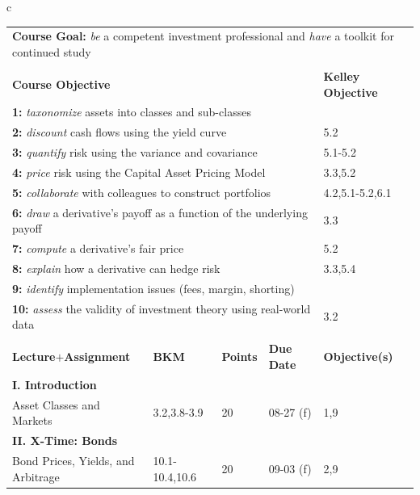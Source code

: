 \documentclass[12pt]{article} %
\begin{document}
\begin{table}[H]
	\small
	\begin{center}
		\begin{tabular}{c}
		\begin{tabular}{lllll}
			\multicolumn{5}{l}{\textbf{Course Goal:} \textit{be} a competent investment professional and \textit{have} a toolkit for continued study}\\ \\
			\multicolumn{4}{l}{\textbf{Course Objective}} & \textbf{Kelley Objective}\\ \hline
			\multicolumn{4}{l}{\textbf{ 1:} \textit{taxonomize} assets into classes and sub-classes} & \\
			\multicolumn{4}{l}{\textbf{ 2:} \textit{discount} cash flows using the yield curve} & 5.2\\
			\multicolumn{4}{l}{\textbf{ 3:} \textit{quantify} risk using the variance and covariance} & 5.1-5.2\\
			\multicolumn{4}{l}{\textbf{ 4:} \textit{price} risk using the Capital Asset Pricing Model} &3.3,5.2 \\
			\multicolumn{4}{l}{\textbf{ 5:} \textit{collaborate} with colleagues to construct portfolios} & 4.2,5.1-5.2,6.1\\
			\multicolumn{4}{l}{\textbf{ 6:} \textit{draw} a derivative's payoff as a function of the underlying payoff} & 3.3\\
			\multicolumn{4}{l}{\textbf{ 7:} \textit{compute} a derivative's fair price} & 5.2\\ 
			\multicolumn{4}{l}{\textbf{ 8:} \textit{explain} how a derivative can hedge risk} & 3.3,5.4\\
			\multicolumn{4}{l}{\textbf{ 9:} \textit{identify} implementation issues (fees, margin, shorting)} & \\
			\multicolumn{4}{l}{\textbf{ 10:} \textit{assess} the validity of investment theory using real-world data} & 3.2\\ \\
			\textbf{Lecture$+$Assignment} & \textbf{BKM} & \textbf{Points} & \textbf{Due Date} & \textbf{Objective(s)} \\ \hline
			\multicolumn{5}{l}{\textbf{I. Introduction}} \\
			Asset Classes and Markets & 3.2,3.8-3.9 & 20 & 08-27 (f) &  1,9\\
			\multicolumn{5}{l}{\textbf{II. X-Time: Bonds}} \\
			Bond Prices, Yields, and Arbitrage & 10.1-10.4,10.6 & 20 & 09-03 (f) &  2,9\\

\end{tabular}
\end{tabular}
\end{center}
\end{table}
\end{document}
